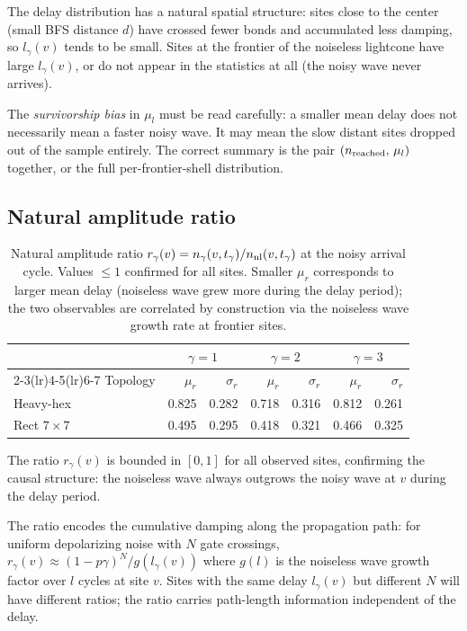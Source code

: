 \documentclass[12pt]{article}
\begin{document}
The delay distribution has a natural spatial structure:
sites close to the center (small BFS distance $d$) have crossed fewer bonds
and accumulated less damping, so $l_\gamma(v)$ tends to be small.
Sites at the frontier of the noiseless lightcone have large $l_\gamma(v)$,
or do not appear in the statistics at all (the noisy wave never arrives).

The \emph{survivorship bias} in $\mu_l$ must be read carefully:
a smaller mean delay does not necessarily mean a faster noisy wave.
It may mean the slow distant sites dropped out of the sample entirely.
The correct summary is the pair $(n_{\rm reached},\, \mu_l)$ together,
or the full per-frontier-shell distribution.

\subsection{Natural amplitude ratio}
\label{sec:ratio_results}

\begin{table}[h]
\centering
\small
\begin{tabular}{l rr rr rr}
\toprule
 & \multicolumn{2}{c}{$\gamma=1$} & \multicolumn{2}{c}{$\gamma=2$}
  & \multicolumn{2}{c}{$\gamma=3$} \\
\cmidrule(lr){2-3}\cmidrule(lr){4-5}\cmidrule(lr){6-7}
Topology & $\mu_r$ & $\sigma_r$ & $\mu_r$ & $\sigma_r$ & $\mu_r$ & $\sigma_r$ \\
\midrule
Heavy-hex   & 0.825 & 0.282 & 0.718 & 0.316 & 0.812 & 0.261 \\
Rect $7\times7$ & 0.495 & 0.295 & 0.418 & 0.321 & 0.466 & 0.325 \\
\bottomrule
\end{tabular}
\caption{Natural amplitude ratio $r_\gamma(v) = n_\gamma(v,t_\gamma) / n_{\rm nl}(v,t_\gamma)$
at the noisy arrival cycle. Values $\leq 1$ confirmed for all sites.
Smaller $\mu_r$ corresponds to larger mean delay (noiseless wave grew more
during the delay period); the two observables are correlated by construction
via the noiseless wave growth rate at frontier sites.}
\label{tab:ratio}
\end{table}

The ratio $r_\gamma(v)$ is bounded in $[0,1]$ for all observed sites,
confirming the causal structure: the noiseless wave always outgrows the
noisy wave at $v$ during the delay period.

The ratio encodes the cumulative damping along the propagation path:
for uniform depolarizing noise with $N$ gate crossings,
$r_\gamma(v) \approx (1-p\gamma)^N / g(l_\gamma(v))$
where $g(l)$ is the noiseless wave growth factor over $l$ cycles at site $v$.
Sites with the same delay $l_\gamma(v)$ but different $N$ will have different
ratios; the ratio carries path-length information independent of the delay.
\end{document}
